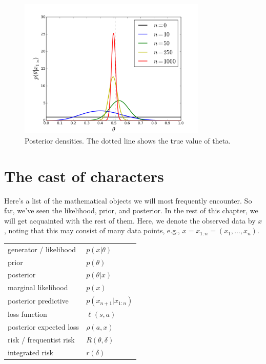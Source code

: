 \documentclass[12pt]{article}
\begin{document}
\begin{figure}
  \begin{center}
    \includegraphics[width=0.8\textwidth]{posterior.png}
  \end{center}
  \caption{Posterior densities. The dotted line shows the true value of theta.}
  \label{figure:posterior}
\end{figure}




\newpage

\section{The cast of characters}

Here's a list of the mathematical objects we will most frequently encounter. So far, we've seen the likelihood, prior, and posterior. In the rest of this chapter, we will get acquainted with the rest of them. Here, we denote the observed data by $x$, noting that this may consist of many data points, e.g., $x = x_{1:n}=(x_1,\dotsc,x_n)$.

\begin{center}
\begin{tabular}{ l l }
generator / likelihood & $p(x|\theta)$  \\
prior & $p(\theta)$ \\
posterior & $p(\theta|x)$ \\
marginal likelihood & $p(x)$ \\
posterior predictive & $p(x_{n+1}|x_{1:n})$ \\
loss function & $\ell(s,a)$ \\
posterior expected loss & $\rho(a,x)$ \\
risk / frequentist risk & $R(\theta,\delta)$ \\
integrated risk & $r(\delta)$
\end{tabular}
\end{center}
\end{document}
